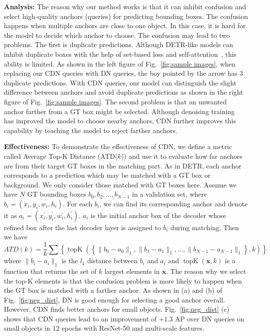 \documentclass[runningheads]{llncs}
\begin{document}
\noindent\textbf{Analysis:} The reason why our method works is that it can inhibit confusion and select high-quality anchors (queries) for predicting bounding boxes. The confusion happens when multiple anchors are close to one object. In this case, it is hard for the model to decide which anchor to choose. The confusion may lead to two problems. The first is duplicate predictions. Although DETR-like models can inhibit duplicate boxes with the help of set-based loss and self-attention~\cite{carion2020end}, this ability is limited. As shown in the left figure of Fig.~\ref{fig:sample images}, when replacing our CDN queries with DN queries, the boy pointed by the arrow has $3$ duplicate predictions. With CDN queries, our model can distinguish the slight difference between anchors and avoid duplicate predictions as shown in the right figure of Fig.~\ref{fig:sample images}. The second problem is that an unwanted anchor farther from a GT box might be selected. Although denoising training~\cite{li2022dn} has improved the model to choose nearby anchors, CDN further improves this capability by teaching the model to reject farther anchors.

\noindent\textbf{Effectiveness:} To demonstrate the effectiveness of CDN, we define a metric called Average Top-K Distance (ATD($k$)) and use it to evaluate how far anchors are from their target GT boxes in the matching part.
As in DETR, each anchor corresponds to a prediction which may be matched with a GT box or background. We only consider those matched with GT boxes here. Assume we have $N$ GT bounding boxes ${b_0, b_2, ..., b_{N-1}}$ in a validation set, where $b_i=(x_i, y_i, w_i, h_i)$. For each $b_i$, we can find its corresponding anchor and denote it as $a_i=(x^{\prime}_i, y^{\prime}_i, w^{\prime}_i, h^{\prime}_i)$. $a_i$ is the initial anchor box of the decoder whose refined box after the last decoder layer is assigned to $b_i$ during matching. Then we have 
\begin{equation}
ATD(k)=\frac{1}{k}\sum\left\{\mathop{topK}\left(\left\{\lVert b_0-a_0 \rVert_{1}, \lVert b_1-a_1 \rVert_{1}, ..., \lVert b_{N-1}-a_{N-1} \rVert_{1}\right\},k\right)\right\}
\end{equation}
where $\lVert b_i-a_i \rVert_{1}$ is the $l_1$ distance between $b_i$ and $a_i$ and $\mathop{topK}(\mathbf{x},k)$ is a function that returns the set of $k$ largest elements in $\mathbf{x}$. The reason why we select the top-K elements is that the confusion problem is more likely to happen when the GT box is matched with a farther anchor. As shown in (a) and (b) of Fig.~\ref{fig:neg_dist}, DN is good enough for selecting a good anchor overall. However, CDN finds better anchors for small objects. Fig.~\ref{fig:neg_dist} (c) shows that CDN queries lead to an improvement of $+1.3$ AP over DN queries on small objects in $12$ epochs with ResNet-50 and multi-scale features.
\end{document}
